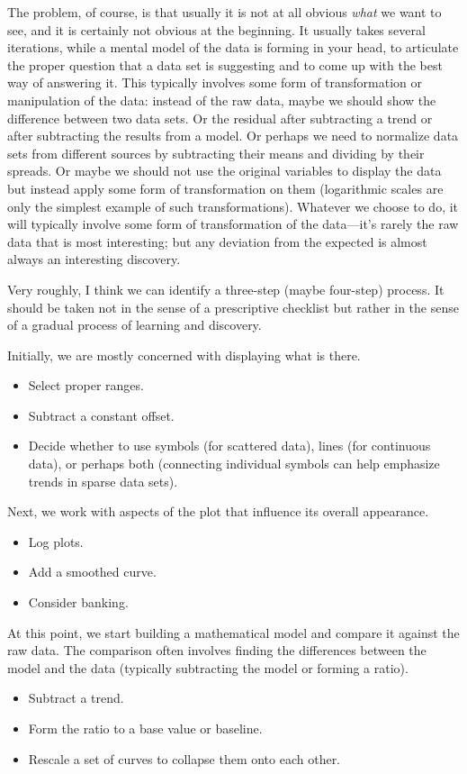 The problem, of course, is that usually it is not at all obvious
\emph{what} we want to see, and it is certainly not obvious at the
beginning. It usually takes several iterations, while a mental model
of the data is forming in your head, to articulate the proper question
that a data set is suggesting and to come up with the best way of
answering it.  This typically involves some form of transformation or
manipulation of the data: instead of the raw data, maybe we should
show the difference between two data sets. Or the residual after
subtracting a trend or after subtracting the results from a model. Or
perhaps we need to normalize data sets from different sources by
subtracting their means and dividing by their spreads. Or maybe we
should not use the original variables to display the data but instead
apply some form of transformation on them (logarithmic scales are only
the simplest example of such transformations). Whatever we choose to
do, it will typically involve some form of transformation of the
data---it's rarely the raw data that is most interesting; but any
deviation from the expected is almost always an interesting discovery.

Very roughly, I think we can identify a three-step (maybe four-step)  
process. It should be taken not in the sense of a prescriptive
checklist but rather in the sense of a gradual process of learning and
discovery.

 Initially, we are mostly concerned with
displaying what is there.
\begin{itemize}
\item Select proper ranges.
\item Subtract a constant offset.
\item Decide whether to use symbols (for scattered data), lines (for
  continuous data), or perhaps both (connecting individual symbols
  can help emphasize trends in sparse data sets).
\end{itemize}

 Next, we work with aspects of the
plot that influence its overall appearance.
\begin{itemize}
\item Log plots.
\item Add a smoothed curve.
\item Consider banking.
\end{itemize}

 At this point, we start building a
mathematical model and compare it against the raw data. The comparison
often involves finding the differences between the model and the data
(typically subtracting the model or forming a ratio).
\begin{itemize}
\item Subtract a trend.
\item Form the ratio to a base value or baseline.
\item Rescale a set of curves to collapse them onto each other.
\end{itemize}

